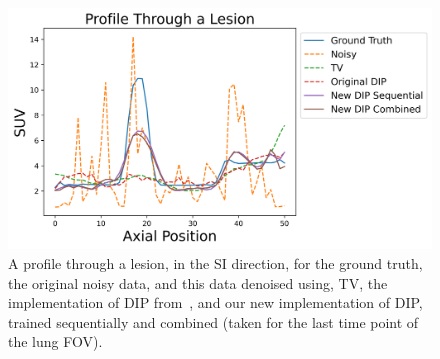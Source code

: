         \begin{figure}
            \centering
            
            \includegraphics[width=1.0\linewidth]{figures/deep_image_prior_results_profile.png}
            
            \captionsetup{singlelinecheck=false, justification=centering}
            \caption{
                A profile through a lesion, in the \gls{SI} direction, for the ground truth, the original noisy data, and this data denoised using, \gls{TV}, the implementation of \gls{DIP} from~\parencite{Gong2019PETPrior}, and our new implementation of \gls{DIP}, trained sequentially and combined (taken for the last time point of the lung \gls{FOV}).
            }
            \label{fig:pseudo_bayesian_dip_denoising_as_a_preprocessing_step_for_kinetic_modelling_in_dynamic_pet_appendix_results_profile}
        \end{figure}
        
